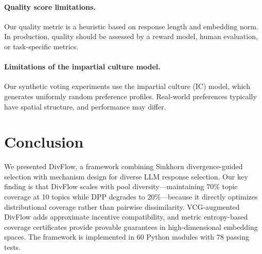 \documentclass[10pt]{article}
\begin{document}
\paragraph{Quality score limitations.}
Our quality metric is a heuristic based on response length and embedding norm.
In production, quality should be assessed by a reward model, human evaluation, or task-specific metrics.

\paragraph{Limitations of the impartial culture model.}
Our synthetic voting experiments use the impartial culture (IC) model, which generates uniformly random preference profiles.
Real-world preferences typically have spatial structure, and performance may differ.

\section{Conclusion}
\label{sec:conclusion}

We presented DivFlow, a framework combining Sinkhorn divergence-guided selection with mechanism design for diverse LLM response selection.
Our key finding is that DivFlow scales with pool diversity---maintaining 70\% topic coverage at 10 topics while DPP degrades to 20\%---because it directly optimizes distributional coverage rather than pairwise dissimilarity.
VCG-augmented DivFlow adds approximate incentive compatibility, and metric entropy-based coverage certificates provide provable guarantees in high-dimensional embedding spaces.
The framework is implemented in 60 Python modules with 78 passing tests.
\end{document}
